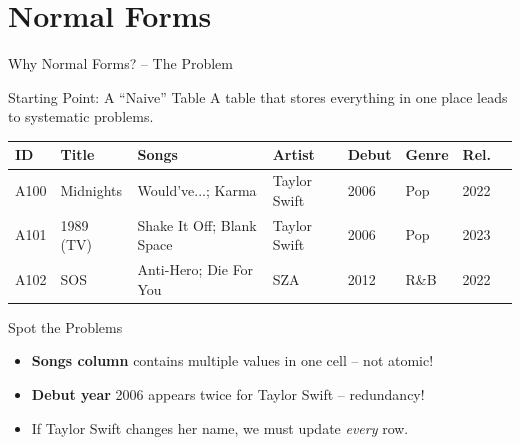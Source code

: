 \section{Normal Forms}

\begin{frame}{Why Normal Forms? -- The Problem}
  \begin{alertblock}{Starting Point: A ``Naive'' Table}
    A table that stores everything in one place leads to systematic problems.
  \end{alertblock}

  \vspace{0.4em}
  \scriptsize
  \begin{tabular}{llllllll}
    \toprule
    \textbf{ID} & \textbf{Title} & \textbf{Songs} & \textbf{Artist} & \textbf{Debut} & \textbf{Genre} & \textbf{Rel.} \\
    \midrule
    A100 & Midnights & Would've...; Karma & Taylor Swift & 2006 & Pop & 2022 \\
    A101 & 1989 (TV) & Shake It Off; Blank Space & Taylor Swift & 2006 & Pop & 2023 \\
    A102 & SOS & Anti-Hero; Die For You & SZA & 2012 & R\&B & 2022 \\
    \bottomrule
  \end{tabular}
  \normalsize

  \vspace{0.5em}
  \begin{block}{Spot the Problems}
    \begin{itemize}
      \item \textbf{Songs column} contains multiple values in one cell -- not atomic!
      \item \textbf{Debut year} 2006 appears twice for Taylor Swift -- redundancy!
      \item If Taylor Swift changes her name, we must update \emph{every} row.
    \end{itemize}
  \end{block}
\end{frame}

